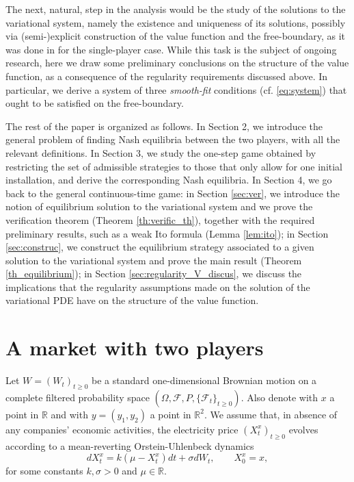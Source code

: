 \documentclass[10pt]{article}
\numberwithin{equation}{section}
\theoremstyle{plain}
\numberwithin{theorem}{section}
\theoremstyle{definition}
\def \R {\mathbb{R}}
\newcommand{\<}{\langle}
\renewcommand{\>}{\rangle}
\renewcommand{\(}{\left(}
\renewcommand{\)}{\right)}
\def \R  {{\mathbb {R}}}
\def \R {{\mathbb {R}}}
\begin{document}
{The next, natural, step in the analysis would be the study of the solutions to the variational system, namely the existence and uniqueness of its solutions, possibly via (semi-)explicit construction of the value function and the free-boundary, as it was done in \cite{MR4305783} for the single-player case. While this task is the subject of ongoing research, here we draw some preliminary conclusions on the structure of the value function, as a consequence of the regularity requirements discussed above. In particular, we derive a system of three \emph{smooth-fit} conditions (cf. \eqref{eq:system}) that ought to be satisfied on the free-boundary. %

\medskip

The rest of the paper is organized as follows. In Section 2, we introduce the general problem of finding Nash equilibria between the two players, with all the relevant definitions. In Section 3, we study the one-step game obtained by restricting the set of admissible strategies to those that only allow for one initial installation, and derive the corresponding Nash equilibria. %
In Section 4, we go back to the general continuous-time game: in Section \ref{sec:ver}, we introduce the notion of equilibrium solution to the variational system and we prove the verification theorem (Theorem \ref{th:verific_th}), together with the required preliminary results, such as {\color{red} a} weak Ito formula (Lemma \ref{lem:ito}); in Section \ref{sec:construc}, we construct the equilibrium strategy associated to a given solution to the variational system and prove the main result (Theorem \ref{th_equilibrium}); in Section \ref{sec:regularity_V_discus}, we discuss the implications that the regularity assumptions made on the solution of the variational PDE have on the structure of the value function. 


\section{A market with two players}\label{sec:game}

Let {$W=(W_t)_{t\geq 0}$} be a standard one-dimensional Brownian motion on  a complete filtered probability space 
$(\Omega,\mathcal{F},P, \{\mathcal{F}_t\}_{t\ge 0})$. Also denote with $x$ a point in $\R$ and with $y=(y_1,y_2)$ a point in $\R^2$. We assume that, in absence of any companies' economic activities, the electricity price $(X^x_t)_{t\ge 0}$ evolves according to a mean-reverting Orstein-Uhlenbeck dynamics
\begin{equation}\label{eq:OU_SDE}
dX^{x}_t=k\left(\mu-X^{x}_t\right)dt+\sigma dW_t, \qquad X^x_0=x,
\end{equation}
for some constants {$k, \sigma >0$} and $\mu\in \R$. 

}
\end{document}
